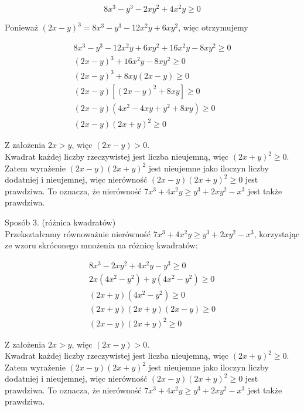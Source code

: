 \documentclass[10pt]{article}
\begin{document}
$$
8 x^{3}-y^{3}-2 x y^{2}+4 x^{2} y \geq 0
$$

Ponieważ $(2 x-y)^{3}=8 x^{3}-y^{3}-12 x^{2} y+6 x y^{2}$, więc otrzymujemy

$$
\begin{gathered}
8 x^{3}-y^{3}-12 x^{2} y+6 x y^{2}+16 x^{2} y-8 x y^{2} \geq 0 \\
(2 x-y)^{3}+16 x^{2} y-8 x y^{2} \geq 0 \\
(2 x-y)^{3}+8 x y(2 x-y) \geq 0 \\
(2 x-y)\left[(2 x-y)^{2}+8 x y\right] \geq 0 \\
(2 x-y)\left(4 x^{2}-4 x y+y^{2}+8 x y\right) \geq 0 \\
(2 x-y)(2 x+y)^{2} \geq 0
\end{gathered}
$$

Z założenia $2 x>y$, więc $(2 x-y)>0$.\\
Kwadrat każdej liczby rzeczywistej jest liczba nieujemną, więc $(2 x+y)^{2} \geq 0$.\\
Zatem wyrażenie $(2 x-y)(2 x+y)^{2}$ jest nieujemne jako iloczyn liczby dodatniej i nieujemnej, więc nierówność $(2 x-y)(2 x+y)^{2} \geq 0$ jest prawdziwa. To oznacza, że nierówność $7 x^{3}+4 x^{2} y \geq y^{3}+2 x y^{2}-x^{3}$ jest także prawdziwa.

Sposób 3. (różnica kwadratów)\\
Przekształcamy równoważnie nierówność $7 x^{3}+4 x^{2} y \geq y^{3}+2 x y^{2}-x^{3}$, korzystając ze wzoru skróconego mnożenia na różnicę kwadratów:

$$
\begin{gathered}
8 x^{3}-2 x y^{2}+4 x^{2} y-y^{3} \geq 0 \\
2 x\left(4 x^{2}-y^{2}\right)+y\left(4 x^{2}-y^{2}\right) \geq 0 \\
(2 x+y)\left(4 x^{2}-y^{2}\right) \geq 0 \\
(2 x+y)(2 x+y)(2 x-y) \geq 0 \\
(2 x-y)(2 x+y)^{2} \geq 0
\end{gathered}
$$

Z założenia $2 x>y$, więc $(2 x-y)>0$.\\
Kwadrat każdej liczby rzeczywistej jest liczba nieujemną, więc $(2 x+y)^{2} \geq 0$.\\
Zatem wyrażenie $(2 x-y)(2 x+y)^{2}$ jest nieujemne jako iloczyn liczby dodatniej i nieujemnej, więc nierówność $(2 x-y)(2 x+y)^{2} \geq 0$ jest prawdziwa. To oznacza, że nierówność $7 x^{3}+4 x^{2} y \geq y^{3}+2 x y^{2}-x^{3}$ jest także prawdziwa.
\end{document}
